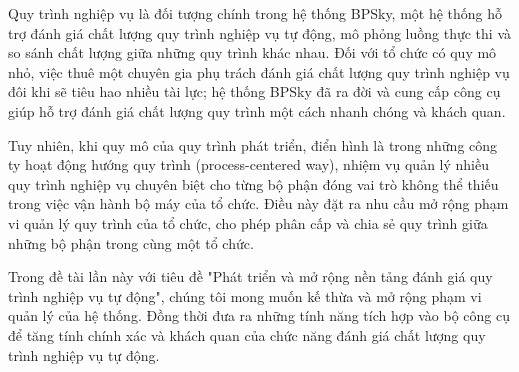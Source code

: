 Quy trình nghiệp vụ là đối tượng chính trong hệ thống BPSky, một hệ thống hỗ trợ đánh giá chất lượng quy trình nghiệp vụ tự động, mô phỏng luồng thực thi và so sánh chất lượng giữa những quy trình khác nhau. Đối với tổ chức có quy mô nhỏ, việc thuê một chuyên gia phụ trách đánh giá chất lượng quy trình nghiệp vụ đôi khi sẽ tiêu hao nhiều tài lực; hệ thống BPSky đã ra đời và cung cấp công cụ giúp hỗ trợ đánh giá chất lượng quy trình một cách nhanh chóng và khách quan.

Tuy nhiên, khi quy mô của quy trình phát triển, điển hình là trong những công ty hoạt động hướng quy trình (process-centered way), nhiệm vụ quản lý nhiều quy trình nghiệp vụ chuyên biệt cho từng bộ phận đóng vai trò không thể thiếu trong việc vận hành bộ máy của tổ chức. Điều này đặt ra nhu cầu mở rộng phạm vi quản lý quy trình của tổ chức, cho phép phân cấp và chia sẻ quy trình giữa những bộ phận trong cùng một tổ chức.

Trong đề tài lần này với tiêu đề "Phát triển và mở rộng nền tảng đánh giá quy trình nghiệp vụ tự động", chúng tôi mong muốn kế thừa và mở rộng phạm vi quản lý của hệ thống. Đồng thời đưa ra những tính năng tích hợp vào bộ công cụ để tăng tính chính xác và khách quan của chức năng đánh giá chất lượng quy trình nghiệp vụ tự động.